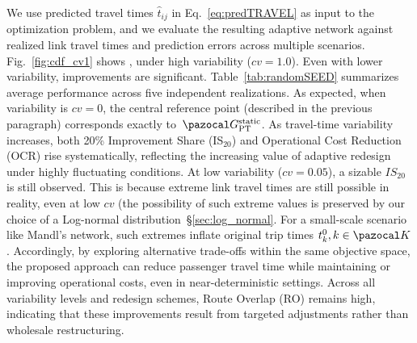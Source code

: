 \documentclass[a4paper,fleqn]{cas-sc}
\begin{document}
We use predicted travel times $\hat{t}_{ij}$ in Eq.~\eqref{eq:predTRAVEL} as input to the optimization problem, and we evaluate the resulting adaptive network against realized link travel times and prediction errors across multiple scenarios.
%
Fig.~\ref{fig:cdf_cv1} shows , under high variability ($cv=1.0$).
Even with lower variability, improvements are significant.
Table~\ref{tab:randomSEED} summarizes average performance across five independent realizations.
As expected, when variability is $\textit{cv}=0$, the central reference point (described in the previous paragraph) corresponds exactly to~$\pazocal G_\text{PT}^\text{static}$. 
As travel-time variability increases, both 20\% Improvement Share (IS$_{20}$) and Operational Cost Reduction (OCR) rise systematically, reflecting the increasing value of adaptive redesign under highly fluctuating conditions.
At low variability ($cv=0.05$), a sizable $IS_{20}$ is still observed. This is because extreme link travel times are still possible in reality, even at low $cv$ (the possibility of such extreme values is preserved by our choice of a Log-normal distribution~\S{}\ref{sec:log_normal}. For a small-scale scenario like Mandl’s network, such extremes inflate original trip times $t_k^0, k\in\pazocal K$.
Accordingly, by exploring alternative trade-offs within the same objective space, the proposed approach can reduce passenger travel time while maintaining or improving operational costs, even in near-deterministic settings.
%
Across all variability levels and redesign schemes, Route Overlap (RO) remains high, indicating that these improvements result from targeted adjustments rather than wholesale restructuring. 
\end{document}
